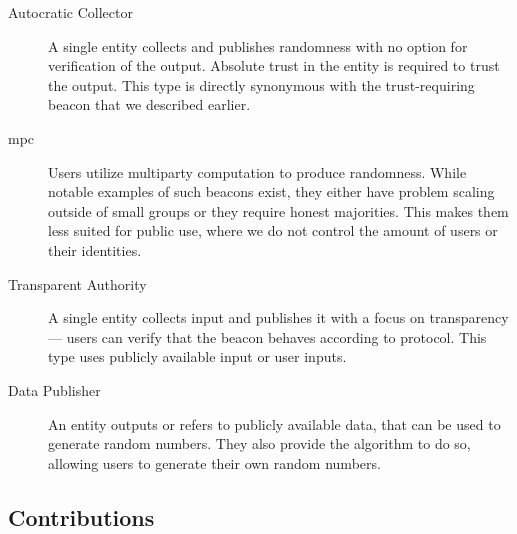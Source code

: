 \begin{description}
    \item [Autocratic Collector] A single entity collects and publishes randomness with no option for verification of the output. Absolute trust in the entity is required to trust the output. This type is directly synonymous with the trust-requiring beacon that we described earlier.

    \item [\gls{mpc}] Users utilize multiparty computation to produce randomness. While notable examples of such beacons exist, they either have problem scaling outside of small groups or they require honest majorities. This makes them less suited for public use, where we do not control the amount of users or their identities.

    \item [Transparent Authority] A single entity collects input and publishes it with a focus on transparency --- users can verify that the beacon behaves according to protocol. This type uses publicly available input or user inputs.

    \item [Data Publisher] An entity outputs or refers to publicly available data, that can be used to generate random numbers. They also provide the algorithm to do so, allowing users to generate their own random numbers.
\end{description}

\subsection{Contributions}
